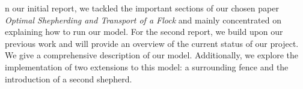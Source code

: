n our initial report, we tackled the important sections of our chosen paper \textit{Optimal Shepherding
and Transport of a Flock}\cite{ranganathan2022} and mainly concentrated on explaining how to run our model.
For the second report, we build upon our previous work and will provide an overview of the current status of our project. We give a comprehensive description of our model. Additionally, we explore the implementation of two extensions to this model: a surrounding fence and the introduction of a second shepherd.